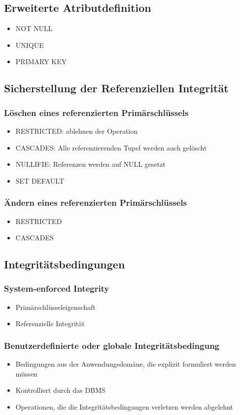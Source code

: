 \subsection{Erweiterte Atributdefinition}
\begin{itemize}
	\item NOT NULL
	\item UNIQUE
	\item PRIMARY KEY
\end{itemize}
\subsection{Sicherstellung der Referenziellen Integrität}
\subsubsection{Löschen eines referenzierten Primärschlüssels}
\begin{itemize}
	\item RESTRICTED: ablehnen der Operation
	\item CASCADES: Alle referenzierenden Tupel werden auch gelöscht
	\item NULLIFIE: Referenzen werden auf NULL gesetzt
	\item SET DEFAULT
\end{itemize}
\subsubsection{Ändern eines referenzierten Primärschlüssels}
\begin{itemize}
	\item RESTRICTED
	\item CASCADES
\end{itemize}

\subsection{Integritätsbedingungen}
\subsubsection{\glqq{}System-enforced Integrity\grqq{}}
\begin{itemize}
	\item Primärschlüsseleigenschaft
	\item Referenzielle Integrität
\end{itemize}
\subsubsection{Benutzerdefinierte oder \glqq{}globale\grqq{} Integritätsbedingung}
\begin{itemize}
	\item Bedingungen aus der Anwendungsdomäne, die explizit formuliert werden müssen
	\item Kontrolliert durch das DBMS
	\item Operationen, die die Integritätsbedingungen verletzen werden abgelehnt
\end{itemize}
